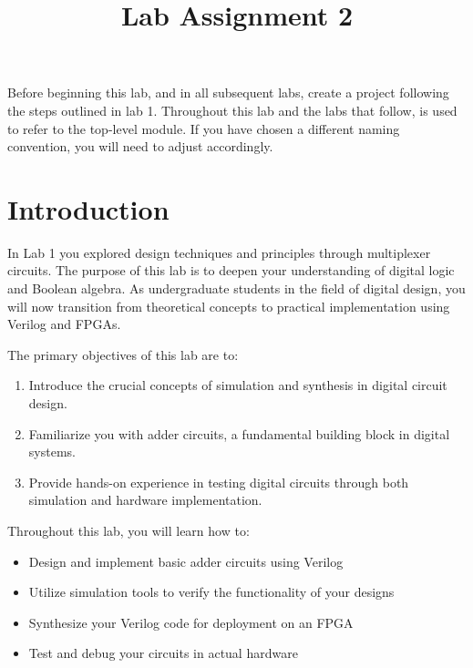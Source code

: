 \documentclass[12pt]{betterjournal}
\title{Lab Assignment 2 }
\author{}
\date{}
\begin{document}
\captionsetup{tablewithin=section}
\maketitle
\begin{important}[frametitle={Create a project}]
Before beginning this lab, and in all subsequent labs, create a project following the steps outlined in lab 1. Throughout this lab and the labs that follow,  is used to refer to the top-level module. If you have chosen a different naming convention, you will need to adjust accordingly.
\end{important}

\section{Introduction}

In Lab 1 you explored design techniques and principles through multiplexer circuits. The purpose of this lab is to deepen your understanding of digital logic and Boolean algebra. As undergraduate students in the field of digital design, you will now transition from theoretical concepts to practical implementation using Verilog and FPGAs.

The primary objectives of this lab are to:
\begin{enumerate}
    \item Introduce the crucial concepts of simulation and synthesis in digital circuit design.
    \item Familiarize you with adder circuits, a fundamental building block in digital systems.
    \item Provide hands-on experience in testing digital circuits through both simulation and hardware implementation.
\end{enumerate}



Throughout this lab, you will learn how to:

\begin{itemize}
\item Design and implement basic adder circuits using Verilog
\item Utilize simulation tools to verify the functionality of your designs
\item Synthesize your Verilog code for deployment on an FPGA
\item Test and debug your circuits in actual hardware
\end{itemize}
\end{document}
